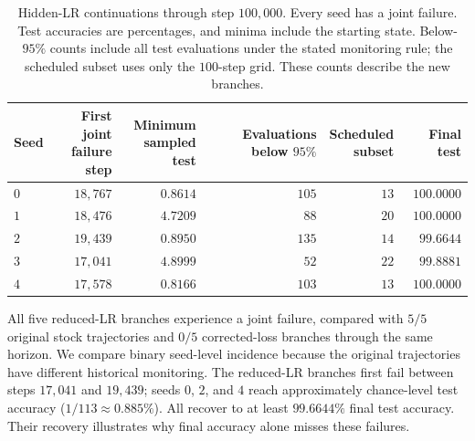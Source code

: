 \begin{table}[htbp]
\centering\small
\caption{Hidden-LR continuations through step $100{,}000$. Every seed has a joint failure. Test accuracies are percentages, and minima include the starting state. Below-$95\%$ counts include all test evaluations under the stated monitoring rule; the scheduled subset uses only the $100$-step grid. These counts describe the new branches.}
\label{tab:lr-reduction}
\begin{tabular}{lrrrrr}
\toprule
Seed & \shortstack{First joint\\failure step} & \shortstack{Minimum\\sampled test} & \shortstack{Evaluations\\below $95\%$} & \shortstack{Scheduled\\subset} & Final test \\
\midrule
$0$ & $18{,}767$ & $0.8614$ & $105$ & $13$ & $100.0000$ \\
$1$ & $18{,}476$ & $4.7209$ & $88$ & $20$ & $100.0000$ \\
$2$ & $19{,}439$ & $0.8950$ & $135$ & $14$ & $99.6644$ \\
$3$ & $17{,}041$ & $4.8999$ & $52$ & $22$ & $99.8881$ \\
$4$ & $17{,}578$ & $0.8166$ & $103$ & $13$ & $100.0000$ \\
\bottomrule
\end{tabular}
\end{table}

All five reduced-LR branches experience a joint failure, compared with $5/5$ original stock trajectories and $0/5$ corrected-loss branches through the same horizon. We compare binary seed-level incidence because the original trajectories have different historical monitoring. The reduced-LR branches first fail between steps $17{,}041$ and $19{,}439$; seeds $0$, $2$, and $4$ reach approximately chance-level test accuracy ($1/113\approx0.885\%$). All recover to at least $99.6644\%$ final test accuracy. Their recovery illustrates why final accuracy alone misses these failures.

